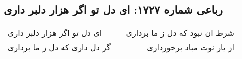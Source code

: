 \begin{center}
\section*{رباعی شماره ۱۷۲۷: ای دل تو اگر هزار دلبر داری}
\label{sec:1727}
\begin{longtable}{l p{0.5cm} r}
ای دل تو اگر هزار دلبر داری
&&
شرط آن نبود که دل ز ما برداری
\\
گر دل داری که دل ز ما برداری
&&
از یار نوت مباد برخورداری
\\
\end{longtable}
\end{center}
